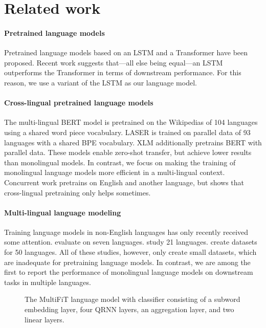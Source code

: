 \documentclass[11pt,a4paper]{article}
\begin{document}
\section{Related work}

\paragraph{Pretrained language models} Pretrained language models based on an LSTM \cite{Peters2018,Howard2018} and a Transformer \cite{Radford2018,Devlin2018} have been proposed.
Recent work \cite{Peters2018a} suggests that---all else being equal---an LSTM outperforms the Transformer in terms of downstream performance. For this reason, we use a variant of the LSTM as our language model.

\paragraph{Cross-lingual pretrained language models} The multi-lingual BERT model is pretrained on the Wikipedias of 104 languages using a shared word piece vocabulary. LASER \cite{Artetxe2018e} is trained on parallel data of 93 languages with a shared BPE vocabulary. XLM \cite{Lample2019} additionally pretrains BERT with parallel data. These models enable zero-shot transfer, but achieve lower results than monolingual models. In contrast, we focus on making the training of monolingual language models more efficient in a multi-lingual context. 
Concurrent work \cite{Mulcaire2019} pretrains on English and another language, but shows that cross-lingual pretraining only helps sometimes.

\paragraph{Multi-lingual language modeling} Training language models in non-English languages has only recently received some attention. \citet{Kawakami2017} evaluate on seven languages. \citet{Cotterell2018} study 21 languages. \citet{Gerz2018} create datasets for 50 languages. All of these studies, however, only create small datasets, which are inadequate for pretraining language models. In contrast, we are among the first to report the performance of monolingual language models on downstream tasks in multiple languages.

\begin{figure}
\centering

\caption{The MultiFiT language model with classifier consisting of a subword embedding layer, four QRNN layers, an aggregation layer, and two linear layers.}
\label{fig:multifit}
\end{figure}
\end{document}
